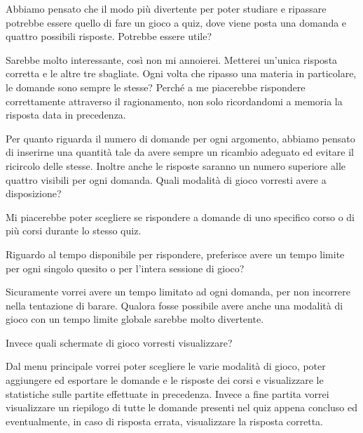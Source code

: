     
    \begin{QandA}
        \item Abbiamo pensato che il modo più divertente per poter studiare e ripassare potrebbe essere quello di fare un gioco a quiz, dove viene posta una domanda e quattro possibili risposte. Potrebbe essere utile?
            \begin{answered}
            Sarebbe molto interessante, così non mi annoierei. Metterei un'unica risposta corretta e le altre tre sbagliate. Ogni volta che ripasso una materia in particolare, le domande sono sempre le stesse? Perché a me piacerebbe rispondere correttamente attraverso il ragionamento, non solo ricordandomi a memoria la risposta data in precedenza.
            \end{answered}
        \item Per quanto riguarda il numero di domande per ogni argomento, abbiamo pensato di inserirne una quantità tale da avere sempre un ricambio adeguato ed evitare il ricircolo delle stesse. Inoltre anche le risposte saranno un numero superiore alle quattro visibili per ogni domanda.
        Quali modalità di gioco vorresti avere a disposizione?
            \begin{answered}
            Mi piacerebbe poter scegliere se rispondere a domande di uno specifico corso o di più corsi durante lo stesso quiz.
            \end{answered}
        \item Riguardo al tempo disponibile per rispondere, preferisce avere un tempo limite per ogni singolo quesito o per l'intera sessione di gioco?
            \begin{answered}
            Sicuramente vorrei avere un tempo limitato ad ogni domanda, per non incorrere nella tentazione di barare. Qualora fosse possibile avere anche una modalità di gioco con un tempo limite globale sarebbe molto divertente.
            \end{answered}
        \item Invece quali schermate di gioco vorresti visualizzare?
            \begin{answered}
            Dal menu principale vorrei poter scegliere le varie modalità di gioco, poter aggiungere ed esportare le domande e le risposte dei corsi e visualizzare le statistiche sulle partite effettuate in precedenza. Invece a fine partita vorrei visualizzare un riepilogo di tutte le domande presenti nel quiz appena concluso ed eventualmente, in caso di risposta errata, visualizzare la risposta corretta.
            \end{answered}
    \end{QandA}

